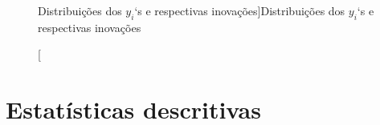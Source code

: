 \documentclass{homework}\usepackage[]{graphicx}\usepackage[]{color}
\newenvironment{knitrout}{}{} %
\begin{document}
\begin{knitrout}
\begin{figure}
\caption[Distribuições dos $y_i$`s e respectivas inovações]{Distribuições dos $y_i$`s e respectivas inovações}\label{fig:AllModels}
\end{figure}

\end{knitrout}

\section{Estatísticas descritivas}
\end{document}
